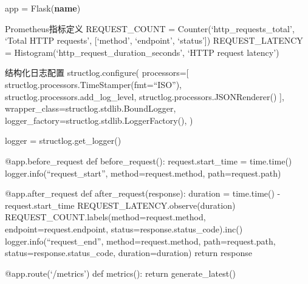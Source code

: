 app = Flask(\textbf{name})

 Prometheus指标定义 REQUEST\_COUNT = Counter(`http\_requests\_total', `Total HTTP requests', {[}`method', `endpoint', `status'{]}) REQUEST\_LATENCY = Histogram(`http\_request\_duration\_seconds', `HTTP request latency')

 结构化日志配置 structlog.configure( processors={[} structlog.processors.TimeStamper(fmt=``ISO''), structlog.processors.add\_log\_level, structlog.processors.JSONRenderer() {]}, wrapper\_class=structlog.stdlib.BoundLogger, logger\_factory=structlog.stdlib.LoggerFactory(), )

logger = structlog.get\_logger()

@app.before\_request def before\_request(): request.start\_time = time.time() logger.info(``request\_start'', method=request.method, path=request.path)

@app.after\_request def after\_request(response): duration = time.time() - request.start\_time REQUEST\_LATENCY.observe(duration) REQUEST\_COUNT.labels(method=request.method, endpoint=request.endpoint, status=response.status\_code).inc() logger.info(``request\_end'', method=request.method, path=request.path, status=response.status\_code, duration=duration) return response

@app.route(`/metrics') def metrics(): return generate\_latest()

